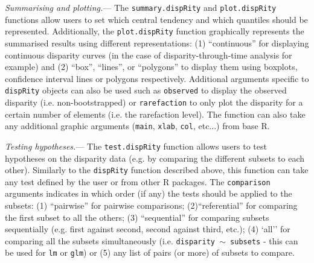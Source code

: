 \documentclass[12pt,letterpaper]{article}
\renewcommand{\subsubsection}[1]{%
\vspace{2ex}
\noindent
\textit{#1.}---}
\newcommand{\disp}{\texttt{dispRity} }
\begin{document}
\subsubsection{Summarising and plotting}
The \texttt{summary.dispRity} and \texttt{plot.dispRity} functions allow users to set which central tendency and which quantiles should be represented.
Additionally, the \texttt{plot.dispRity} function graphically represents the summarised results using different representations: (1) ``continuous'' for displaying continuous disparity curves (in the case of disparity-through-time analysis for example) and (2) ``box'', ``lines'', or ``polygons'' to display them using boxplots, confidence interval lines or polygons respectively.
Additional arguments specific to \disp objects can also be used such as \texttt{observed} to display the observed disparity (i.e. non-bootstrapped) or \texttt{rarefaction} to only plot the disparity for a certain number of elements (i.e. the rarefaction level).
The function can also take any additional graphic arguments (\texttt{main}, \texttt{xlab}, \texttt{col}, etc...) from base R.

\subsubsection{Testing hypotheses}
The \texttt{test.dispRity} function allows users to test hypotheses on the disparity data (e.g. by comparing the different subsets to each other).
Similarly to the \disp function described above, this function can take any test defined by the user or from other R packages.
The \texttt{comparison} arguments indicates in which order (if any) the tests should be applied to the subsets: (1) ``pairwise'' for pairwise comparisons; (2)``referential'' for comparing the first subset to all the others; (3) ``sequential'' for comparing subsets sequentially (e.g. first against second, second against third, etc.); (4) `all'' for comparing all the subsets simultaneously (i.e. \texttt{disparity $\mathtt{\sim}$ subsets} - this can be used for \texttt{lm} or \texttt{glm}) or (5) any list of pairs (or more) of subsets to compare.
\end{document}
